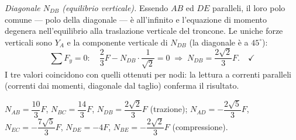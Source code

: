 \begin{esercizio}
\begin{svolgimento}
		\smallskip
		\textit{Diagonale $N_{DB}$ (equilibrio verticale).}
		Essendo $AB$ ed $DE$ paralleli, il loro polo comune
		--- polo della diagonale --- è all'infinito e
		l'equazione di momento degenera nell'equilibrio alla
		traslazione verticale del troncone. Le uniche forze
		verticali sono $Y_A$ e la componente verticale di
		$N_{DB}$ (la diagonale è a $45^\circ$):
		\[
		\sum F_y = 0:\quad
		\frac{2}{3}F - N_{DB}\cdot\frac{1}{\sqrt2} = 0
		\;\Rightarrow\;
		N_{DB} = \frac{2\sqrt2}{3}F. \quad\checkmark
		\]
		I tre valori coincidono con quelli ottenuti per
		nodi: la lettura a correnti paralleli (correnti dai
		momenti, diagonale dal taglio) conferma il risultato.
		
	\end{svolgimento}
	
	\risultato
	$N_{AB} = \dfrac{10}{3}F$,\;
	$N_{BC} = \dfrac{14}{3}F$,\;
	$N_{DB} = \dfrac{2\sqrt2}{3}F$ (trazione);\;
	$N_{AD} = -\dfrac{2\sqrt5}{3}F$,\;
	$N_{EC} = -\dfrac{7\sqrt5}{3}F$,\;
	$N_{DE} = -4F$,\;
	$N_{BE} = -\dfrac{2\sqrt2}{3}F$ (compressione).
	
\end{esercizio}

